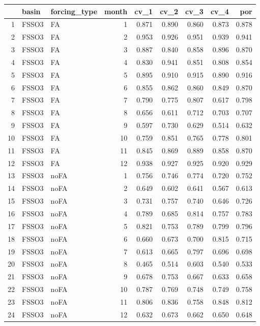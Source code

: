 \documentclass{agujournal2019}
\begin{document}
\begin{table}[ht]
\centering
\begin{tabular}{rllrrrrrr}
  \hline
 & basin & forcing\_type & month & cv\_1 & cv\_2 & cv\_3 & cv\_4 & por \\ 
  \hline
1 & FSSO3 & FA &    1 & 0.871 & 0.890 & 0.860 & 0.873 & 0.878 \\ 
  2 & FSSO3 & FA &    2 & 0.953 & 0.926 & 0.951 & 0.939 & 0.941 \\ 
  3 & FSSO3 & FA &    3 & 0.887 & 0.840 & 0.858 & 0.896 & 0.870 \\ 
  4 & FSSO3 & FA &    4 & 0.830 & 0.941 & 0.851 & 0.808 & 0.854 \\ 
  5 & FSSO3 & FA &    5 & 0.895 & 0.910 & 0.915 & 0.890 & 0.916 \\ 
  6 & FSSO3 & FA &    6 & 0.855 & 0.862 & 0.860 & 0.849 & 0.870 \\ 
  7 & FSSO3 & FA &    7 & 0.790 & 0.775 & 0.807 & 0.617 & 0.798 \\ 
  8 & FSSO3 & FA &    8 & 0.656 & 0.611 & 0.712 & 0.703 & 0.707 \\ 
  9 & FSSO3 & FA &    9 & 0.597 & 0.730 & 0.629 & 0.514 & 0.632 \\ 
  10 & FSSO3 & FA &   10 & 0.759 & 0.851 & 0.765 & 0.778 & 0.801 \\ 
  11 & FSSO3 & FA &   11 & 0.845 & 0.869 & 0.889 & 0.858 & 0.870 \\ 
  12 & FSSO3 & FA &   12 & 0.938 & 0.927 & 0.925 & 0.920 & 0.929 \\ 
  13 & FSSO3 & noFA &    1 & 0.756 & 0.746 & 0.774 & 0.720 & 0.752 \\ 
  14 & FSSO3 & noFA &    2 & 0.649 & 0.602 & 0.641 & 0.567 & 0.613 \\ 
  15 & FSSO3 & noFA &    3 & 0.731 & 0.757 & 0.740 & 0.646 & 0.726 \\ 
  16 & FSSO3 & noFA &    4 & 0.789 & 0.685 & 0.814 & 0.757 & 0.783 \\ 
  17 & FSSO3 & noFA &    5 & 0.821 & 0.753 & 0.789 & 0.799 & 0.796 \\ 
  18 & FSSO3 & noFA &    6 & 0.660 & 0.673 & 0.700 & 0.815 & 0.715 \\ 
  19 & FSSO3 & noFA &    7 & 0.613 & 0.665 & 0.797 & 0.696 & 0.698 \\ 
  20 & FSSO3 & noFA &    8 & 0.465 & 0.514 & 0.603 & 0.540 & 0.533 \\ 
  21 & FSSO3 & noFA &    9 & 0.678 & 0.753 & 0.667 & 0.633 & 0.658 \\ 
  22 & FSSO3 & noFA &   10 & 0.787 & 0.769 & 0.748 & 0.749 & 0.758 \\ 
  23 & FSSO3 & noFA &   11 & 0.806 & 0.836 & 0.758 & 0.848 & 0.812 \\ 
  24 & FSSO3 & noFA &   12 & 0.632 & 0.673 & 0.662 & 0.650 & 0.648 \\ 
   \hline
\end{tabular}
\end{table}
\end{document}
